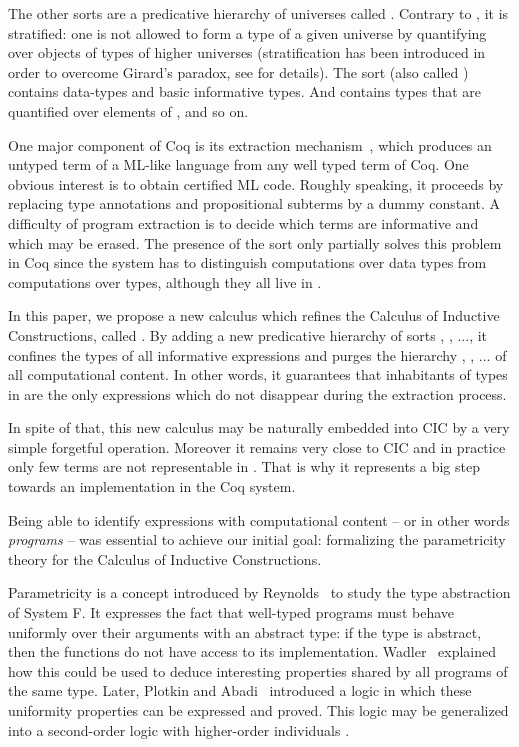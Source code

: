 \documentclass[a4paper,USenglish]{lipics}
\def\coq{\textsf{Coq}\xspace}
\def\ml{\textsf{ML}\xspace}
\def\cic{\textsf{CIC}\xspace}
\def\cicr{\xspace}
\newcommand{\ML}{{\ml}}
\begin{document}
The other sorts are a predicative hierarchy of universes called
. Contrary to , it is stratified: one is
not allowed to form a type of a given universe by quantifying over
objects of types of higher universes (stratification has been
introduced in order to overcome Girard's paradox, see
\cite{DBLP:conf/lics/Coquand86} for details). The sort 
(also called ) contains data-types and basic informative
types. And  contains types that are quantified over elements of
, and so on.

One major component of \coq is its extraction
mechanism~\cite{DBLP:conf/types/Letouzey02}, which produces an untyped
term of a \ML-like language from any well typed term of \coq. One
obvious interest is to obtain certified ML code. Roughly speaking, it
proceeds by replacing type annotations and propositional subterms by a
dummy constant. A
difficulty of program extraction is to decide
which terms are informative and which may be erased.
The presence of the sort 
only partially solves this problem in \coq since the system has to
distinguish computations over data types from computations over types,
although they all live in .

In this paper, we propose a new calculus  which refines the Calculus of
Inductive Constructions, called \cicr. By adding a new predicative hierarchy of sorts
, , ..., it confines the types of all informative expressions
and purges the hierarchy , , ... of all computational
content. In other words, it guarantees that inhabitants of types in 
are the only expressions which do not disappear during the extraction
process.

In spite of that, this new calculus may be naturally embedded into
\cic by a very simple forgetful operation. Moreover it remains very
close to \cic and in practice only few terms are not representable
in \cicr. That is why it represents a big step towards an
implementation in the \coq system.

Being able to identify expressions with computational content
-- or in other words \emph{programs} -- was essential to achieve our
initial goal: formalizing the parametricity theory for the Calculus of
Inductive Constructions.

Parametricity is a concept introduced by
Reynolds~\cite{DBLP:conf/ifip/Reynolds83} to study the type abstraction of
System F. It expresses the fact that well-typed programs must behave
uniformly over their arguments with an abstract type: if the type is
abstract, then the functions do not have access to its implementation.
Wadler~\cite{Wadler89} explained how this could be used to
deduce interesting properties shared by all programs of the same type.
Later, Plotkin and Abadi~\cite{DBLP:conf/tlca/PlotkinA93} introduced a logic in which these uniformity
properties can be expressed and proved. This logic may be generalized into
a second-order logic with higher-order individuals
\cite{DBLP:journals/fuin/Takeuti98, DBLP:journals/tcs/Wadler07}.
\end{document}
